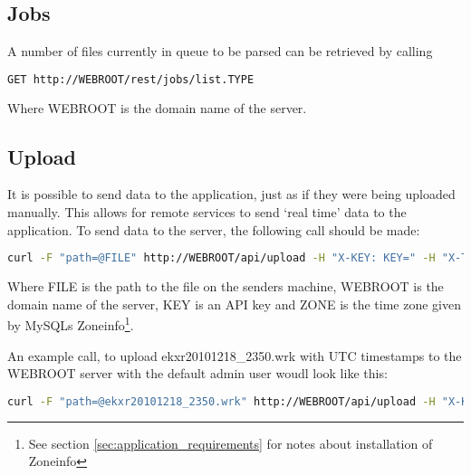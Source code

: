 \subsection{Jobs}
A number of files currently in queue to be parsed can be retrieved by calling
\begin{lstlisting}[language=sh,caption={Url for retrieving the number of files queued for process}]
GET http://WEBROOT/rest/jobs/list.TYPE
\end{lstlisting}
Where \textsf{WEBROOT} is the domain name of the server.

\subsection{Upload}
It is possible to send data to the application, just as if they were being uploaded manually. This allows for remote services to send `real time' data to the application. To send data to the server, the following call should be made:
\begin{lstlisting}[language=sh,caption={cURL call to send file}]
curl -F "path=@FILE" http://WEBROOT/api/upload -H "X-KEY: KEY=" -H "X-TIMEZONE: ZONE" -X POST
\end{lstlisting}
Where \textsf{FILE} is the path to the file on the senders machine, \textsf{WEBROOT} is the domain name of the server, \textsf{KEY} is an API key and \textsf{ZONE} is the time zone given by MySQLs Zoneinfo\footnote{See section \ref{sec:application_requirements} for notes about installation of Zoneinfo}.

An example call, to upload \textsf{ekxr20101218\_2350.wrk} with UTC timestamps to the \textsf{WEBROOT} server with the default admin user woudl look like this:
\begin{lstlisting}[language=sh,caption={Example cURL call to send a file}]
curl -F "path=@ekxr20101218_2350.wrk" http://WEBROOT/api/upload -H "X-KEY: YWqmPGH+dOEvOh6pf83a62lzJ1QQLHRMPHhNIaohB3s=" -H "X-TIMEZONE: UTC" -X POST
\end{lstlisting}